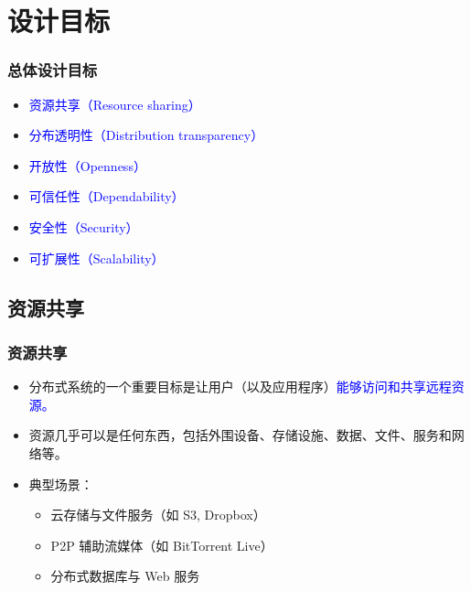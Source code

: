 \documentclass[UTF8,a4paper,11pt]{ctexart}
\newcommand{\blue}[1]{\textcolor{blue}{#1}}
\begin{document}
\section{设计目标}

\subsubsection*{总体设计目标}

\begin{itemize}
  \item \blue{资源共享（Resource sharing）}
  \item \blue{分布透明性（Distribution transparency）}
  \item \blue{开放性（Openness）}
  \item \blue{可信任性（Dependability）}
  \item \blue{安全性（Security）}
  \item \blue{可扩展性（Scalability）}
\end{itemize}

\subsection{资源共享}

\subsubsection*{资源共享}

\begin{itemize}
  \item 分布式系统的一个重要目标是让用户（以及应用程序）\blue{能够访问和共享远程资源。}
  \item 资源几乎可以是任何东西，包括外围设备、存储设施、数据、文件、服务和网络等。
  \item 典型场景：
  \begin{itemize}
    \item 云存储与文件服务（如 S3, Dropbox）
    \item P2P 辅助流媒体（如 BitTorrent Live）
    \item 分布式数据库与 Web 服务
  \end{itemize}
\end{itemize}
\end{document}
